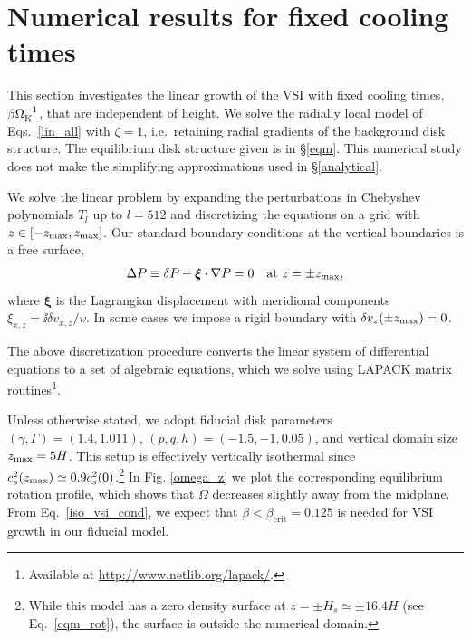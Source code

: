 \section{Numerical results for fixed cooling times}\label{numerical}
This section investigates the linear growth of the VSI with fixed
cooling times, $\beta\Omega_{\rm K}^{-1}$, that are independent of height.  
We solve the radially local model of Eqs.\ \ref{lin_all} with
$\zeta=1$, i.e.\ retaining  radial gradients of the background disk
structure. The equilibrium disk structure given is in \S\ref{eqm}. This
numerical study does not make the simplifying approximations  
used in \S\ref{analytical}. 

We solve the linear problem by expanding the 
perturbations in Chebyshev polynomials $T_l$ up to $l=512$
and discretizing the equations on a grid with
$z\in[-z_\mathrm{max},z_\mathrm{max}]$. Our standard boundary conditions at the vertical
boundaries is a free surface,  
\begin{align}\label{bc}
  \Delta P \equiv \delta P + \bm{\xi}\cdot\nabla P= 0 \quad \text{at } z=\pm z_\mathrm{max},
\end{align}
where $\bm{\xi}$ is the Lagrangian displacement with meridional 
components $\xi_{x,z} = \ii\delta v_{x,z}/\upsilon$. In some cases we
impose a rigid boundary with $\delta v_z(\pm z_\mathrm{max})=0$. 

The above discretization procedure
converts the linear system of differential equations to a set of 
algebraic equations,  which we solve using LAPACK matrix
routines\footnote{Available at \url{http://www.netlib.org/lapack/}.}.  

Unless otherwise stated, we adopt fiducial disk parameters 
$(\gamma, \Gamma) = (1.4, 1.011)$, $(p,q, h)=(-1.5,-1,0.05)$, and 
vertical domain size $z_\mathrm{max}=5H$. This setup is effectively vertically
isothermal since $c_s^2(z_\mathrm{max}) \simeq 0.9c_s^2(0)$.\footnote{While this model
has a zero density surface at $z = \pm H_s \simeq \pm 16.4 H$ (see Eq.\ \ref{eqm_rot}), the surface is 
outside the numerical domain.} In Fig. \ref{omega_z}
we plot the corresponding equilibrium rotation profile, which shows
that $\Omega$ decreases slightly away from the midplane.   From Eq.\ \ref{iso_vsi_cond},
we expect that $\beta < \beta_\mathrm{crit} = 0.125$ is needed for VSI growth in our fiducial model. 

